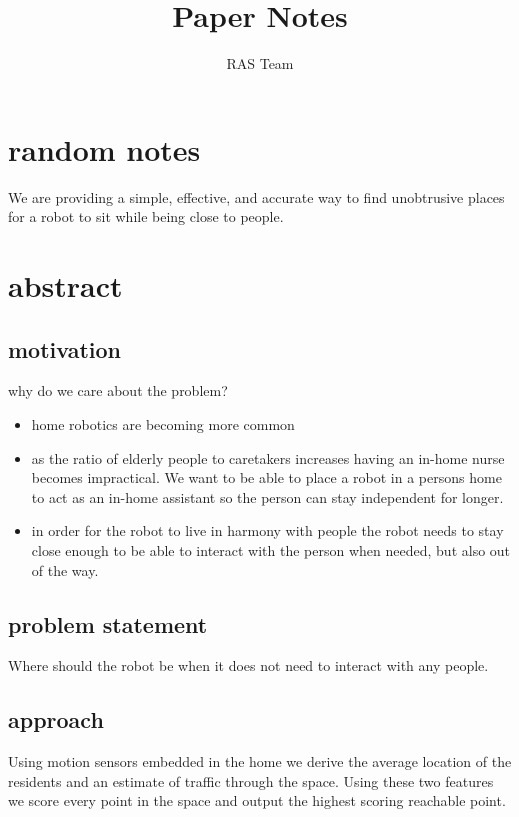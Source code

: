 \documentclass[11pt, conference, a4paper]{IEEEtran}
\author{RAS Team}
\title{Paper Notes}
\begin{document}
\maketitle

\section{random notes}

We are providing a simple, effective, and accurate way to find unobtrusive 
places for a robot to sit while being close to people.


\section{abstract}

\subsection{motivation}
why do we care about the problem?
\begin{itemize}
    \item home robotics are becoming more common
    \item as the ratio of elderly people to caretakers increases having an 
        in-home nurse becomes impractical. We want to be able to place a robot 
        in a persons home to act as an in-home assistant so the person can stay 
        independent for longer.
    \item in order for the robot to live in harmony with people the robot needs 
        to stay close enough to be able to interact with the person when 
        needed, but also out of the way.
\end{itemize}

\subsection{problem statement}
Where should the robot be when it does not need to interact with any people.

\subsection{approach}
Using motion sensors embedded in the home we derive the average location of the 
residents and an estimate of traffic through the space. Using these two 
features we score every point in the space and output the highest scoring 
reachable point.
\end{document}

